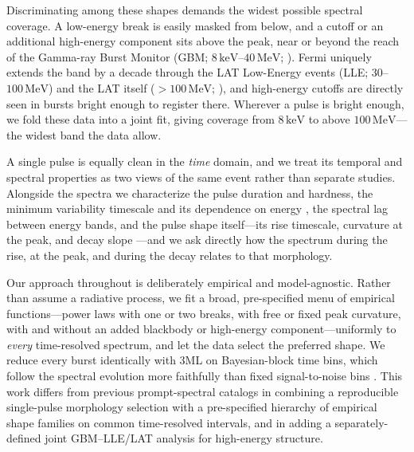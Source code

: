 \documentclass[twocolumn]{aastex631}
\begin{document}
Discriminating among these shapes demands the widest possible spectral coverage. A
low-energy break is easily masked from below, and a cutoff or an additional
high-energy component sits above the peak, near or beyond the reach of the Gamma-ray
Burst Monitor (GBM; $8\,\mathrm{keV}$--$40\,\mathrm{MeV}$; \citealt{Meegan2009}).
Fermi uniquely extends the band by a decade through the LAT Low-Energy events
(LLE; $30$--$100\,\mathrm{MeV}$) and the LAT itself
($>100\,\mathrm{MeV}$; \citealt{Atwood2009}), and high-energy cutoffs are directly
seen in bursts bright enough to register there. Wherever a pulse is bright enough,
we fold these data into a joint fit, giving coverage from $8\,\mathrm{keV}$ to above
$100\,\mathrm{MeV}$---the widest band the data allow.

A single pulse is equally clean in the \emph{time} domain, and we treat its temporal
and spectral properties as two views of the same event rather than separate studies.
Alongside the spectra we characterize the pulse duration and hardness, the minimum
variability timescale and its dependence on energy \citep{Golkhou2014,Golkhou2015},
the spectral lag between energy bands, and the pulse shape itself---its rise
timescale, curvature at the peak, and decay slope
\citep{Norris2005,Kocevski2003,Gowri2025}---and we ask directly how the spectrum
during the rise, at the peak, and during the decay relates to that morphology.

Our approach throughout is deliberately empirical and model-agnostic. Rather than
assume a radiative process, we fit a broad, pre-specified menu of empirical
functions---power laws with one or two breaks, with free or fixed peak curvature,
with and without an added blackbody or high-energy component---uniformly to
\emph{every} time-resolved spectrum, and let the data select the preferred shape. We
reduce every burst identically with \textsc{3ML} \citep{Vianello2015} on
Bayesian-block time bins, which follow the spectral evolution more faithfully than
fixed signal-to-noise bins \citep{Scargle2013}. This work differs from previous
prompt-spectral catalogs in combining a reproducible single-pulse morphology
selection \citep{Busby2024} with a pre-specified hierarchy of empirical shape
families on common time-resolved intervals, and in adding a separately-defined joint
GBM--LLE/LAT analysis for high-energy structure.
\end{document}

